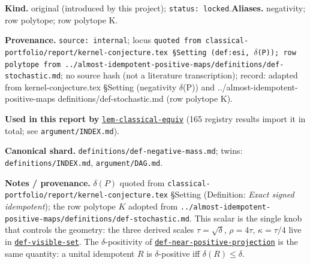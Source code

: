 \begin{defnote}
\textbf{Kind.} original (introduced by this project); \texttt{status: locked}.\quad\textbf{Aliases.} negativity; row polytope; row polytope K.
\par
\textbf{Provenance.} \texttt{source: internal}; locus \texttt{quoted from classical-\allowbreak{}portfolio/\allowbreak{}report/\allowbreak{}kernel-\allowbreak{}conjecture.\allowbreak{}tex \S{}Setting (def:\allowbreak{}esi,\allowbreak{} \textnormal{$\delta$}(P));\allowbreak{} row polytope from ..\allowbreak{}/\allowbreak{}almost-\allowbreak{}idempotent-\allowbreak{}positive-\allowbreak{}maps/\allowbreak{}definitions/\allowbreak{}def-\allowbreak{}stochastic.\allowbreak{}md}; no source hash (not a literature transcription); record: adapted from kernel-\allowbreak{}conjecture.\allowbreak{}tex \S{}Setting (negativity \textnormal{$\delta$}(P)) and ..\allowbreak{}/\allowbreak{}almost-\allowbreak{}idempotent-\allowbreak{}positive-\allowbreak{}maps definitions/\allowbreak{}def-\allowbreak{}stochastic.\allowbreak{}md (row polytope K).
\par
\textbf{Used in this report by} \hyperref[lem:classical-equiv]{\texttt{lem-\allowbreak{}classical-\allowbreak{}equiv}} (165 registry results import it in total; see \texttt{argument/INDEX.md}).
\par
\textbf{Canonical shard.} \texttt{definitions/\allowbreak{}def-\allowbreak{}negative-\allowbreak{}mass.\allowbreak{}md}; twins: \texttt{definitions/INDEX.md}, \texttt{argument/DAG.md}.
\par
\textbf{Notes / provenance.} $\delta(P)$ quoted from \texttt{classical-\allowbreak{}portfolio/\allowbreak{}report/\allowbreak{}kernel-\allowbreak{}conjecture.\allowbreak{}tex}
\S{}Setting (Definition: \emph{Exact signed idempotent}); the row polytope $K$ adopted from
\texttt{..\allowbreak{}/\allowbreak{}almost-\allowbreak{}idempotent-\allowbreak{}positive-\allowbreak{}maps/\allowbreak{}definitions/\allowbreak{}def-\allowbreak{}stochastic.\allowbreak{}md}. This scalar is the single knob that
controls the geometry: the three derived scales $\tau=\sqrt\delta$, $\rho=4\tau$, $\kappa=\tau/4$ live in
\hyperref[def:visible-set]{\texttt{def-\allowbreak{}visible-\allowbreak{}set}}. The $\delta$-positivity of \hyperref[def:near-positive-projection]{\texttt{def-\allowbreak{}near-\allowbreak{}positive-\allowbreak{}projection}} is the same quantity: a
unital idempotent $R$ is $\delta$-positive iff $\delta(R)\le\delta$.
\end{defnote}

